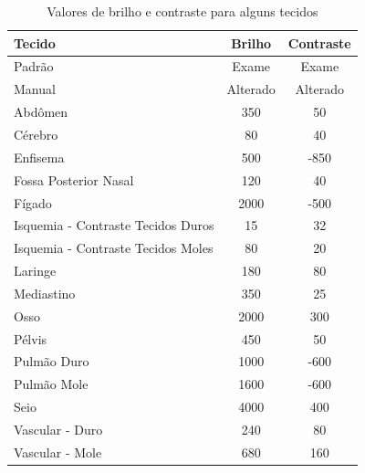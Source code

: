 \begin{table}[h]
\centering
\caption{Valores de brilho e contraste para alguns tecidos}
\begin{tabular}{lcc}\\
\hline %
Tecido & Brilho & Contraste\\
\hline
\hline
Padrão & Exame & Exame\\
Manual & Alterado & Alterado\\
Abdômen & 350 & 50 \\
Cérebro & 80 & 40\\
Enfisema & 500 & -850\\
Fossa Posterior Nasal & 120 & 40\\
Fígado & 2000 & -500\\
Isquemia - Contraste Tecidos Duros & 15 & 32\\
Isquemia - Contraste Tecidos Moles & 80 & 20\\
Laringe & 180 & 80\\
Mediastino & 350 & 25\\
Osso & 2000 & 300\\
Pélvis & 450 & 50\\
Pulmão Duro & 1000 & -600\\
Pulmão Mole & 1600 & -600\\
Seio & 4000 & 400\\
Vascular - Duro & 240 & 80\\
Vascular - Mole & 680 & 160\\
\hline
\end{tabular}
\label{tab:window_level}
\end{table} 

